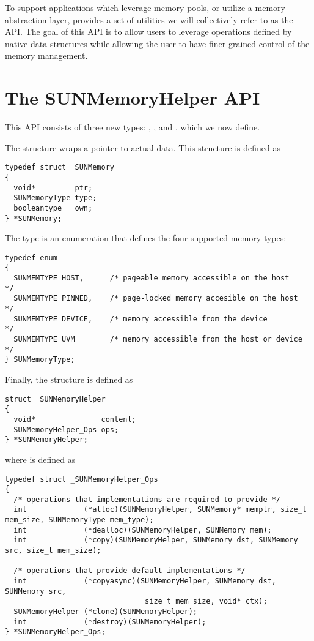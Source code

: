 To support applications which leverage memory pools, or utilize a memory
abstraction layer, {\sundials} provides a set of utilities we will
collectively refer to as the  API. The goal of this
API is to allow users to leverage operations defined by native {\sundials} data
structures while allowing the user to have finer-grained control of the memory
management.

\section{The SUNMemoryHelper API}\label{s:sunmemory}

This API consists of three new {\sundials} types: ,
, and , which we now define.

The  structure wraps a pointer to actual data. This structure
is defined as
\begin{verbatim}
typedef struct _SUNMemory
{
  void*         ptr;
  SUNMemoryType type;
  booleantype   own;
} *SUNMemory;
\end{verbatim}

The  type is an enumeration that defines the four supported
memory types:
\begin{verbatim}
typedef enum
{
  SUNMEMTYPE_HOST,      /* pageable memory accessible on the host     */
  SUNMEMTYPE_PINNED,    /* page-locked memory accesible on the host   */
  SUNMEMTYPE_DEVICE,    /* memory accessible from the device          */
  SUNMEMTYPE_UVM        /* memory accessible from the host or device  */
} SUNMemoryType;
\end{verbatim}

Finally, the  structure is defined as
\begin{verbatim}
struct _SUNMemoryHelper
{
  void*               content;
  SUNMemoryHelper_Ops ops;
} *SUNMemoryHelper;
\end{verbatim}
where  is defined as
\begin{verbatim}
typedef struct _SUNMemoryHelper_Ops
{
  /* operations that implementations are required to provide */
  int             (*alloc)(SUNMemoryHelper, SUNMemory* memptr, size_t mem_size, SUNMemoryType mem_type);
  int             (*dealloc)(SUNMemoryHelper, SUNMemory mem);
  int             (*copy)(SUNMemoryHelper, SUNMemory dst, SUNMemory src, size_t mem_size);

  /* operations that provide default implementations */
  int             (*copyasync)(SUNMemoryHelper, SUNMemory dst, SUNMemory src,
                                size_t mem_size, void* ctx);
  SUNMemoryHelper (*clone)(SUNMemoryHelper);
  int             (*destroy)(SUNMemoryHelper);
} *SUNMemoryHelper_Ops;
\end{verbatim}



